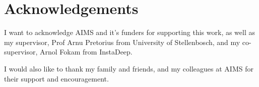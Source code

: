 \chapter*{Acknowledgements}

I want to acknowledge AIMS and it's funders for supporting this work, as well as my supervisor, Prof Arnu Pretorius from University of Stellenbosch, and my co-supervisor, Arnol Fokam from InstaDeep.

I would also like to thank my family and friends, and my colleagues at AIMS for their support and encouragement.
